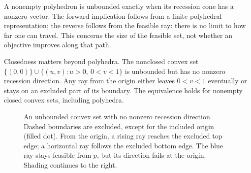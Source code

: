 \documentclass[11pt,a4paper]{article}
\begin{document}
A nonempty polyhedron is unbounded exactly when its recession cone has a nonzero
vector. The forward implication follows from a finite polyhedral representation;
the reverse follows from the feasible ray: there is no limit to how far one
can travel. This concerns the size of the feasible set, not whether an objective
improves along that path.

\noindent
\begin{minipage}{\linewidth}
  Closedness matters beyond polyhedra. The nonclosed convex set
  $\{(0,0)\}\cup\{(u,v):u>0,\ 0<v<1\}$ is unbounded but has no nonzero recession
  direction. Any ray from the origin either leaves $0<v<1$ eventually or stays
  on an excluded part of its boundary. The equivalence holds for nonempty closed
  convex sets, including polyhedra.

  \begin{figure}[H]
    \centering
    \caption{An unbounded convex set with no nonzero recession direction.
      Dashed boundaries are excluded, except for the included origin (filled dot).
      From the origin, a rising ray reaches the excluded top edge; a horizontal
      ray follows the excluded bottom edge. The blue ray stays feasible from
      $p$, but its direction fails at the origin. Shading continues to the right.}
    \label{fig:nonclosed-recession}
  \end{figure}
\end{minipage}
\end{document}

